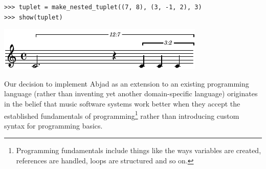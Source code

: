 \documentclass{article}
\begin{document}
\begin{lstlisting}
>>> tuplet = make_nested_tuplet((7, 8), (3, -1, 2), 3)
>>> show(tuplet)
\end{lstlisting}
\includegraphics{assets/lilypond-4926e77647583925d3a89653f8577025.pdf}

\noindent Our decision to implement Abjad as an extension to an existing
programming language (rather than inventing yet another domain-specific
language) originates in the belief that music software systems work better when
they accept the established fundamentals of programming\footnote{Programming
fundamentals include things like the ways variables are created, references are
handled, loops are structured and so on.} rather than introducing custom syntax
for programming basics.
\end{document}
